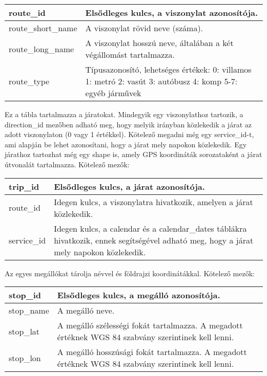 \begin{tabular}{|p{3cm}|p{10cm}|}
\hline
route\_id & Elsődleges kulcs, a viszonylat azonosítója. \\
\hline
route\_short\_name & A viszonylat rövid neve (száma). \\
\hline
route\_long\_name & A viszonylat hosszú neve, általában a két végállomást tartalmazza. \\
\hline
route\_type & Típusazonosító, lehetséges értékek:
0: villamos
1: metró
2: vasút
3: autóbusz
4: komp
5-7: egyéb járművek \\
\hline
\end{tabular}


Ez a tábla tartalmazza a járatokat. Mindegyik egy viszonylathoz tartozik, a direction\_id mezőben adható meg, hogy melyik irányban közlekedik a járat az adott viszonylaton (0 vagy 1 értékkel). Kötelező megadni még egy service\_id-t, ami alapján be lehet azonosítani, hogy a járat mely napokon közlekedik. Egy járathoz tartozhat még egy shape is, amely GPS koordináták sorozataként a járat útvonalát tartalmazza.
Kötelező mezők:

\begin{tabular}{|p{3cm}|p{10cm}|}
\hline
trip\_id & Elsődleges kulcs, a járat azonosítója. \\
\hline
route\_id & Idegen kulcs, a viszonylatra hivatkozik, amelyen a járat közlekedik. \\
\hline
service\_id & Idegen kulcs, a calendar és a calendar\_dates táblákra hivatkozik, ennek segítségével adható meg, hogy a járat mely napokon közlekedik. \\
\hline
\end{tabular}


Az egyes megállókat tárolja névvel és földrajzi koordinátákkal.
Kötelező mezők:

\begin{tabular}{|p{3cm}|p{10cm}|}
\hline
stop\_id & Elsődleges kulcs, a megálló azonosítója. \\
\hline
stop\_name & A megálló neve. \\
\hline
stop\_lat & A megálló szélességi fokát tartalmazza. A megadott értéknek WGS 84 szabvány szerintinek kell lenni. \\
\hline
stop\_lon & A megálló hosszúsági fokát tartalmazza. A megadott értéknek WGS 84 szabvány szerintinek kell lenni. \\
\hline
\end{tabular}

